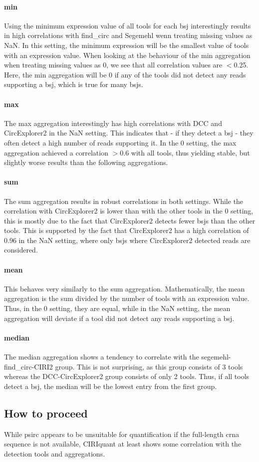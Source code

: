 \paragraph{min}
Using the minimum expression value of all tools for each \gls{bsj}
interestingly results in high correlations with find\_circ and Segemehl wenn
treating missing values as NaN.
In this setting, the minimum expression will be the smallest value of tools
with an expression value.
When looking at the behaviour of the min aggregation when treating missing
values as 0, we see that all correlation values are $<$0.25.
Here, the min aggregation will be 0 if any of the tools did not detect any
reads supporting a \gls{bsj}, which is true for many \glspl{bsj}.

\paragraph{max}
The max aggregation interestingly has high correlations with DCC and
CircExplorer2 in the NaN setting.
This indicates that - if they detect a \gls{bsj} - they often detect a high
number of reads supporting it.
In the 0 setting, the max aggregation achieved a correlation $>$0.6 with all
tools, thus yielding stable, but slightly worse results than the following
aggregations.

\paragraph{sum}
The sum aggregation results in robust correlations in both settings.
While the correlation with CircExplorer2 is lower than with the other tools in
the 0 setting, this is mostly due to the fact that CircExplorer2 detects fewer
\glspl{bsj} than the other tools.
This is supported by the fact that CircExplorer2 has a high correlation of 0.96
in the NaN setting, where only \glspl{bsj} where CircExplorer2 detected reads
are considered.

\paragraph{mean}
This behaves very similarly to the sum aggregation.
Mathematically, the mean aggregation is the sum divided by the number of tools
with an expression value.
Thus, in the 0 setting, they are equal, while in the NaN setting, the mean
aggregation will deviate if a tool did not detect any reads supporting a
\gls{bsj}.

\paragraph{median}
The median aggregation shows a tendency to correlate with the
segemehl-find\_circ-CIRI2 group.
This is not surprising, as this group consists of 3 tools whereas the
DCC-CircExplorer2 group consists of only 2 tools.
Thus, if all tools detect a \gls{bsj}, the median will be the lowest entry from
the first group.

\subsection{How to proceed}

While psirc appears to be unsuitable for quantification if the full-length
\gls{crna} sequence is not available, CIRIquant at least shows some correlation
with the detection tools and aggregations.

